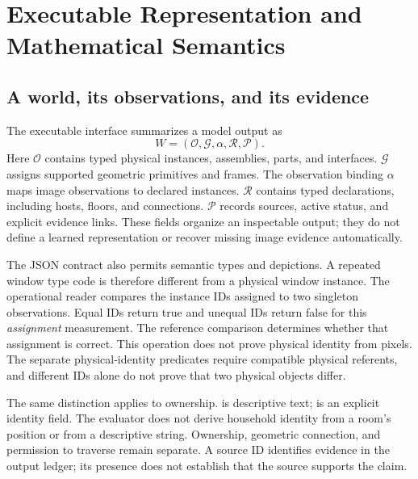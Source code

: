 \section{Executable Representation and Mathematical Semantics}
\label{app:C}

\subsection{A world, its observations, and its evidence}
The executable interface summarizes a model output as
\begin{equation}
W=(\mathcal O,\mathcal G,\alpha,\mathcal R,\mathcal P).
\end{equation}
Here $\mathcal O$ contains typed physical instances, assemblies, parts, and interfaces. $\mathcal G$ assigns supported geometric primitives and frames. The observation binding $\alpha$ maps image observations to declared instances. $\mathcal R$ contains typed declarations, including hosts, floors, and connections. $\mathcal P$ records sources, active status, and explicit evidence links. These fields organize an inspectable output; they do not define a learned representation or recover missing image evidence automatically.

The JSON contract also permits semantic types and depictions. A repeated window type code is therefore different from a physical window instance. The operational  reader compares the instance IDs assigned to two singleton observations. Equal IDs return true and unequal IDs return false for this \emph{assignment} measurement. The reference comparison determines whether that assignment is correct. This operation does not prove physical identity from pixels. The separate physical-identity predicates require compatible physical referents, and different IDs alone do not prove that two physical objects differ.

The same distinction applies to ownership.  is descriptive text;  is an explicit identity field. The evaluator does not derive household identity from a room's position or from a descriptive string. Ownership, geometric connection, and permission to traverse remain separate. A source ID identifies evidence in the output ledger; its presence does not establish that the source supports the claim.


